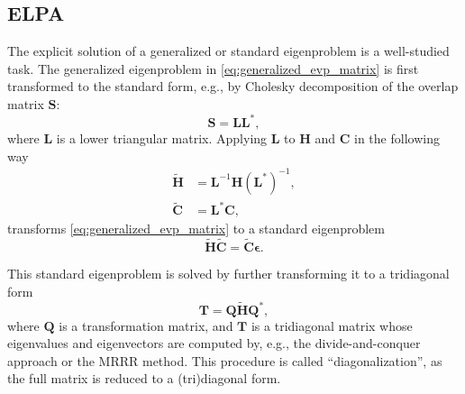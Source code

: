 \documentclass{report}
\begin{document}
\subsection{ELPA}
\label{subsec:solvers_elpa}
The explicit solution of a generalized or standard eigenproblem is a well-studied task. The generalized eigenproblem in \ref{eq:generalized_evp_matrix} is first transformed to the standard form, e.g., by Cholesky decomposition of the overlap matrix $\boldsymbol{S}$:
\begin{equation}
\label{eq:cholesky}
\boldsymbol{S} = \boldsymbol{L} \boldsymbol{L}^* ,
\end{equation}
where $\boldsymbol{L}$ is a lower triangular matrix. Applying $\boldsymbol{L}$ to $\boldsymbol{H}$ and $\boldsymbol{C}$ in the following way
\begin{equation}
\label{eq:to_standard}
\begin{split}
\boldsymbol{\tilde{H}} & = \boldsymbol{L}^{-1} \boldsymbol{H} (\boldsymbol{L}^*)^{-1} ,\\
\boldsymbol{\tilde{C}} & = \boldsymbol{L}^* \boldsymbol{C} ,
\end{split}
\end{equation}
transforms \ref{eq:generalized_evp_matrix} to a standard eigenproblem
\begin{equation}
\label{eq:standard_evp}
\boldsymbol{\tilde{H}} \boldsymbol{\tilde{C}} = \boldsymbol{\tilde{C}} \boldsymbol{\epsilon} .
\end{equation}

This standard eigenproblem is solved by further transforming it to a tridiagonal form
\begin{equation}
\label{eq:elpa1}
\boldsymbol{T} = \boldsymbol{Q} \boldsymbol{\tilde{H}} \boldsymbol{Q}^* ,
\end{equation}
where $\boldsymbol{Q}$ is a transformation matrix, and $\boldsymbol{T}$ is a tridiagonal matrix whose eigenvalues and eigenvectors are computed by, e.g., the divide-and-conquer approach or the MRRR method. This procedure is called ``diagonalization'', as the full matrix is reduced to a (tri)diagonal form.
\end{document}
